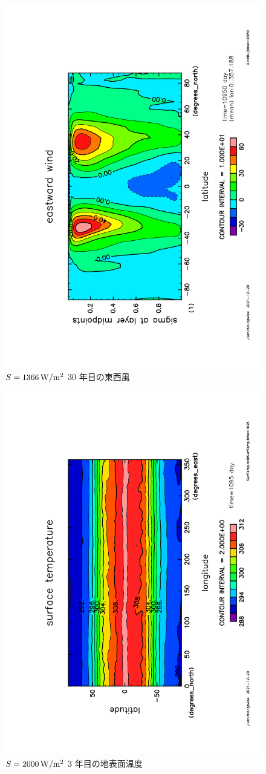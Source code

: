 \documentclass[body]{subfiles}
\begin{document}
\begin{figure}[t]
	\includegraphics[height=\textwidth,angle=-90]{S1366U,time=10950.pdf}
	\caption{\(S=1366\hmu{W/m^2}\) 30 年目の東西風}
\end{figure}
\begin{figure}[t]
	\includegraphics[height=\textwidth,angle=-90]{S2000SurfTemp,time=1095.pdf}
	\caption{\(S=2000\hmu{W/m^2}\) 3 年目の地表面温度}
\end{figure}
\end{document}
